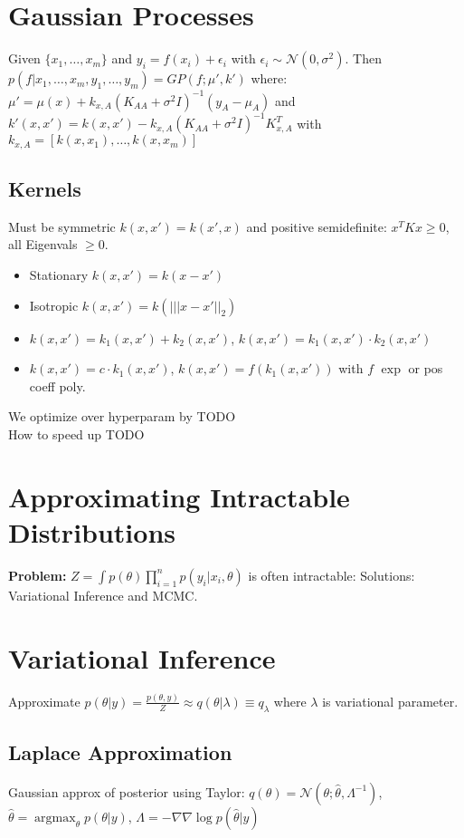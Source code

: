 \documentclass[11pt]{article}
\newcommand{\gauss}{\mathcal{N}}
\newcommand{\argmax}{\operatorname{argmax}}
\begin{document}
\begin{multicols*}{3}
	\section*{Gaussian Processes}
	Given $\{x_1,\ldots,x_m\}$ and $y_i = f(x_i) + \epsilon_i$ with $\epsilon_i \sim \gauss(0,\sigma^2)$. Then $p(f|x_1,\ldots,x_m,y_1,\ldots,y_m) = GP(f;\mu',k')$ where:
	$\mu' = \mu(x) + k_{x,A}(K_{AA} + \sigma^2 I )^{-1}(y_A - \mu_A)$ and $k'(x,x') = k(x,x') - k_{x,A}(K_{AA} + \sigma^2 I)^{-1} K_{x,A}^T$ with $k_{x,A} = [k(x,x_1), \ldots, k(x,x_m)]$
	\subsection*{Kernels}
	Must be symmetric $k(x,x') = k(x',x)$ and positive semidefinite: $x^TKx \geq 0$, all Eigenvals $\geq 0$.
	\begin{itemize}
		\item Stationary $k(x,x') = k(x-x')$
		\item Isotropic $k(x,x') = k(|||x-x'||_2)$
		\item $k(x,x') = k_1(x,x') + k_2(x,x')$, $k(x,x') = k_1(x,x') \cdot k_2(x,x')$
		\item $k(x,x') = c\cdot k_1(x,x')$, $k(x,x') = f(k_1(x,x'))$ with $f$ $\exp$ or pos coeff poly.
	\end{itemize}
	We optimize over hyperparam by TODO \\
	How to speed up TODO
	
	\section*{Approximating Intractable Distributions}
	\textbf{Problem:} $Z = \int p(\theta) \prod_{i=1}^{n} p(y_i| x_i, \theta)$ is often intractable: Solutions: Variational Inference and MCMC.
	
	\section*{Variational Inference}
	Approximate $p(\theta|y) = \frac{p(\theta, y)}{Z}\approx q(\theta| \lambda)\equiv q_\lambda$ where $\lambda$ is variational parameter.
	\subsection*{Laplace Approximation}
	Gaussian approx of posterior using Taylor: $q(\theta) = \gauss(\theta;\hat{\theta},\Lambda^{-1})$, $\hat{\theta} = \argmax_\theta p(\theta|y)$, $\Lambda = -\nabla \nabla \log p(\hat{\theta}|y)$
	

\end{multicols*}
\end{document}
